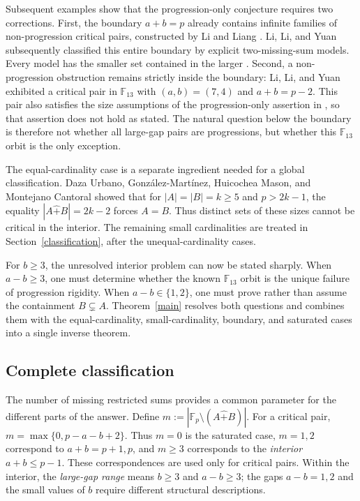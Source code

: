 \documentclass[10pt,a4paper]{amsart}
\newcommand{\F}{\mathbb{F}_p}
\newcommand{\rs}{\mathbin{\widehat+}}
\begin{document}
Subsequent examples show that the progression-only conjecture requires
two corrections.  First, the boundary $a+b=p$ already contains infinite
families of non-progression critical pairs, constructed by Li and Liang
\cite[Theorems 2.1 and 2.3]{LL}.  Li, Li, and Yuan
\cite[Theorem 1.1]{HLY} subsequently classified this entire boundary
by explicit two-missing-sum models.  Every model has the smaller set
contained in the larger \cite[Proposition 3.2(i)]{HLY}.
Second, a non-progression obstruction remains strictly inside the boundary:
Li, Li, and Yuan \cite[Example 4.1]{HLY} exhibited a critical pair in
$\mathbb F_{13}$ with $(a,b)=(7,4)$ and $a+b=p-2$.  This pair also satisfies
the size assumptions of the progression-only assertion in
\cite[Theorem 3.1, version 2]{LL}, so that assertion does not hold as
stated.  The natural question below the boundary is therefore not whether
all large-gap pairs are progressions, but whether this $\mathbb F_{13}$
orbit is the only exception.

The equal-cardinality case is a separate ingredient needed for a global
classification.  Daza Urbano, Gonz\'alez-Mart\'inez, Huicochea Mason, and
Montejano Cantoral \cite[Theorem 7]{DGHM} showed that for
$|A|=|B|=k\ge5$ and $p>2k-1$, the equality
$|A\rs B|=2k-2$ forces $A=B$.  Thus distinct sets of these sizes cannot be
critical in the interior.  The remaining small cardinalities are treated in
Section~\ref{classification}, after the unequal-cardinality cases.

For $b\ge3$, the unresolved interior problem can now be stated sharply.
When $a-b\ge3$, one must determine whether the known $\mathbb F_{13}$
orbit is the unique failure of progression rigidity.  When
$a-b\in\{1,2\}$, one must prove rather than assume the containment
$B\subsetneq A$.  Theorem~\ref{main} resolves both questions and combines
them with the equal-cardinality, small-cardinality, boundary, and
saturated cases into a single inverse theorem.

\subsection{Complete classification}

The number of missing restricted sums provides a common parameter for
the different parts of the answer.  Define $m:=|\F\setminus(A\rs B)|$.
For a critical pair, $m=\max\{0,p-a-b+2\}$.  Thus $m=0$ is the saturated case, $m=1,2$ correspond to $a+b=p+1,p$,
and $m\ge3$ corresponds to the \emph{interior} $a+b\le p-1$.
These correspondences are used only for critical pairs.  Within the
interior, the \emph{large-gap range} means $b\ge3$ and $a-b\ge3$;
the gaps $a-b=1,2$ and the small values of $b$ require different
structural descriptions.
\end{document}

